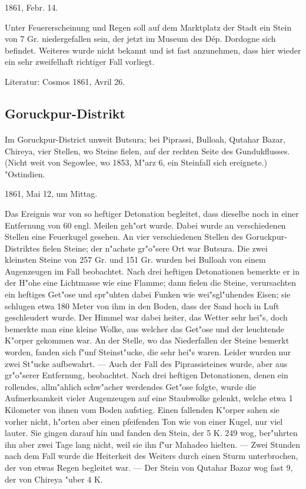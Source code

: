 \documentclass[a4paper, 11pt, oneside]{article}
\begin{document}
1861, Febr. 14.

Unter Feuererscheinung und Regen soll auf dem Marktplatz der Stadt ein Stein von 7 Gr. niedergefallen sein, der jetzt im Museum des Dép. Dordogne sich befindet. Weiteres wurde nicht bekannt und ist fast anzunehmen, dass hier wieder ein sehr zweifelhaft richtiger Fall vorliegt.

\footnotesize
Literatur: Cosmos 1861, Avril 26.

\subsection{Goruckpur-Distrikt}
\normalsize
\paragraph{}
Im Goruckpur-District unweit Butsura; bei Piprassi, Bulloah, Qutahar Bazar, Chireya, vier Stellen, wo Steine fielen, auf der rechten Seite des Gundukflusses. (Nicht weit von Segowlee, wo 1853, M"arz 6, ein Steinfall sich ereignete.) "Ostindien.

1861, Mai 12, um Mittag.

Das Ereignis war von so heftiger Detonation begleitet, dass dieselbe noch in einer Entfernung von 60 engl. Meilen geh"ort wurde. Dabei wurde an verschiedenen Stellen eine Feuerkugel gesehen. An vier verschiedenen Stellen des Goruckpur-Distriktes fielen Steine; der n"achste gr"o"sere Ort war Butsura. Die zwei kleinsten Steine von 257 Gr. und 151 Gr. wurden bei Bulloah von einem Augenzeugen im Fall beobachtet. Nach drei heftigen Detonationen bemerkte er in der H"ohe eine Lichtmasse wie eine Flamme; dann fielen die Steine, verursachten ein heftiges Get"ose und spr"uhten dabei Funken wie wei"sgl"uhendes Eisen; sie schlugen etwa 180 Meter von ihm in den Boden, dass der Sand hoch in Luft geschleudert wurde. Der Himmel war dabei heiter, das Wetter sehr hei"s, doch bemerkte man eine kleine Wolke, aus welcher das Get"ose und der leuchtende K"orper gekommen war. An der Stelle, wo das Niederfallen der Steine bemerkt worden, fanden sich f"unf Steinst"ucke, die sehr hei"s waren. Leider wurden nur zwei St"ucke aufbewahrt. --- Auch der Fall des Piprassisteines wurde, aber aus gr"o"serer Entfernung, beobachtet. Nach drei heftigen Detonationen, denen ein rollendes, allm"ahlich schw"acher werdendes Get"ose folgte, wurde die Aufmerksamkeit vieler Augenzeugen auf eine Staubwolke gelenkt, welche etwa 1 Kilometer von ihnen vom Boden aufstieg. Einen fallenden K"orper sahen sie vorher nicht, h"orten aber einen pfeifenden Ton wie von einer Kugel, nur viel lauter. Sie gingen darauf hin und fanden den Stein, der 5 K. 249 wog, ber"uhrten ihn aber zwei Tage lang nicht, weil sie ihn f"ur Mahadeo hielten. --- Zwei Stunden nach dem Fall wurde die Heiterkeit des Weiters durch einen Sturm unterbrochen, der von etwas Regen begleitet war. --- Der Stein von Qutahar Bazar wog fast 9, der von Chireya "uber 4 K.
\end{document}

